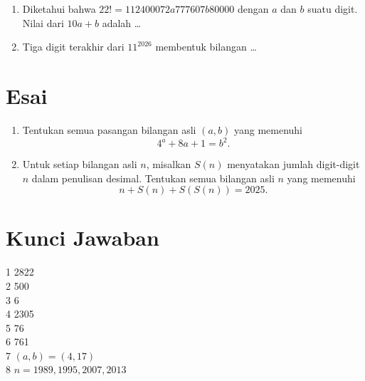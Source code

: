 \documentclass[12pt]{scrartcl}
\begin{document}
\begin{enumerate}
	\item Diketahui bahwa $22! = 112400072a777607b80000$ dengan $a$ dan $b$ suatu digit.
	Nilai dari $10a + b$ adalah \dots

	\item Tiga digit terakhir dari $11^{2026}$ membentuk bilangan \dots

\end{enumerate}

\section{Esai}

\begin{enumerate}[resume]

	\item Tentukan semua pasangan bilangan asli $(a, b)$ yang memenuhi
	\[ 4^a + 8a + 1 = b^2. \]

	\item Untuk setiap bilangan asli $n$, misalkan $S(n)$ menyatakan jumlah digit-digit $n$
	dalam penulisan desimal. Tentukan semua bilangan asli $n$ yang memenuhi
	\[ n + S(n) + S(S(n)) = 2025. \]

\end{enumerate}

\section{Kunci Jawaban}
1 2822\\
2 500\\
3 6\\
4 2305\\
5 76\\
6 761\\
7 $(a, b) = (4, 17)$\\
8 $n = 1989, 1995, 2007, 2013$
\end{document}
